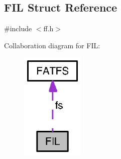 \subsection{F\+I\+L Struct Reference}
\label{struct_f_i_l}


{\ttfamily \#include $<$ff.\+h$>$}



Collaboration diagram for F\+I\+L\+:
\nopagebreak
\begin{figure}[H]
\begin{center}
\leavevmode
\includegraphics[width=85pt]{struct_f_i_l__coll__graph}
\end{center}
\end{figure}
